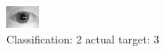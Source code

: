 \begin{figure}[h!]
\begin{center}
\includegraphics[width=0.60\columnwidth]{figures/ID1042_class_2_target_3.png}
\end{center}
\caption{ Classification: 2 actual target: 3}
\label{fig:ID1042_class_2_target_3}
\end{figure}
